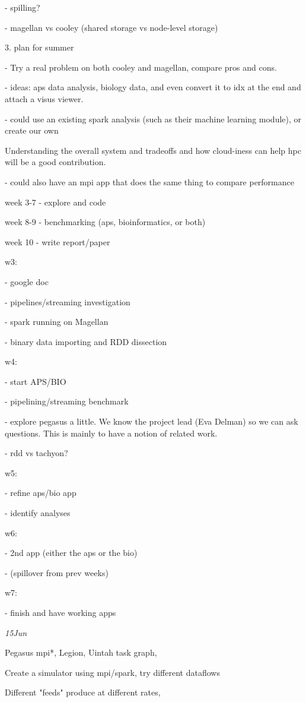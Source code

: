 \documentclass{sig-alternate}
\begin{document}
- spilling?

- magellan vs cooley (shared storage vs node-level storage)

3. plan for summer

- Try a real problem on both cooley and magellan, compare pros and cons.

- ideas: aps data analysis, biology data, and even convert it to idx at
the end and attach a visus viewer.

- could use an existing spark analysis (such as their machine learning
module), or create our own

Understanding the overall system and tradeoffs and how cloud-iness can
help hpc will be a good contribution.

- could also have an mpi app that does the same thing to compare
performance

week 3-7 - explore and code

week 8-9 - benchmarking (aps, bioinformatics, or both)

week 10 - write report/paper

w3:

- google doc

- pipelines/streaming investigation

- spark running on Magellan

- binary data importing and RDD dissection

w4:

- start APS/BIO

- pipelining/streaming benchmark

- explore pegasus a little. We know the project lead (Eva Delman) so we
can ask questions. This is mainly to have a notion of related work.

- rdd vs tachyon?

w5:

- refine aps/bio app

- identify analyses

w6:

- 2nd app (either the aps or the bio)

- (spillover from prev weeks)

w7:

- finish and have working apps

\emph{15Jun}

Pegasus mpi*, Legion, Uintah task graph,

Create a simulator using mpi/spark, try different dataflows

Different "feeds" produce at different rates,
\end{document}
